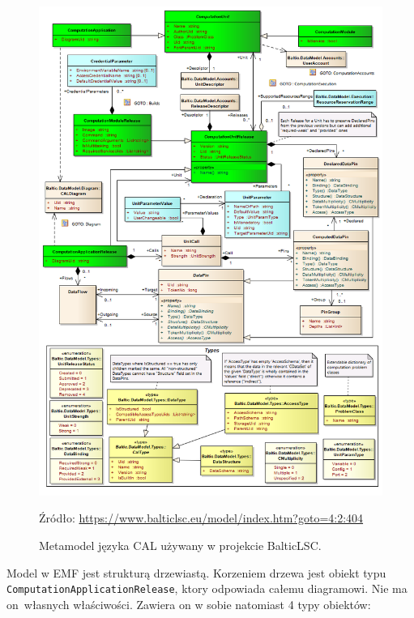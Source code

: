 \begin{figure}[!hb]
	\centering

	\includegraphics[width=0.92\linewidth]{./images/cal-metamodel-balticlsc.png}
	\caption{Metamodel języka CAL używany w projekcie
		BalticLSC\@.}\label{rys:cal-metamodel-balticlsc}

	\medskip
	{\small Źródło:
		\url{https://www.balticlsc.eu/model/index.htm?goto=4:2:404}}
\end{figure}

Model w EMF jest strukturą drzewiastą. Korzeniem drzewa jest obiekt typu
\texttt{ComputationApplicationRelease}, ktory odpowiada całemu diagramowi. Nie
ma on~własnych właściwości. Zawiera on w sobie natomiast 4 typy obiektów:

